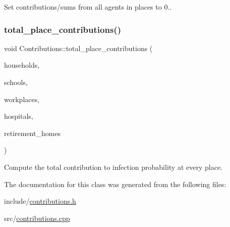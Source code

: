 Set contributions/sums from all agents in places to 0.. 

\mbox{\label{classContributions_a6312bd1753a80b88d91c6f94fb581eb2}} 
\subsubsection{\texorpdfstring{total\+\_\+place\+\_\+contributions()}{total\_place\_contributions()}}
{\footnotesize\ttfamily void Contributions\+::total\+\_\+place\+\_\+contributions (\begin{DoxyParamCaption}\item[{std\+::vector$<$ \hyperlink{classHousehold}{Household} $>$ \&}]{households,  }\item[{std\+::vector$<$ \hyperlink{classSchool}{School} $>$ \&}]{schools,  }\item[{std\+::vector$<$ \hyperlink{classWorkplace}{Workplace} $>$ \&}]{workplaces,  }\item[{std\+::vector$<$ \hyperlink{classHospital}{Hospital} $>$ \&}]{hospitals,  }\item[{std\+::vector$<$ \hyperlink{classRetirementHome}{Retirement\+Home} $>$ \&}]{retirement\+\_\+homes }\end{DoxyParamCaption})}



Compute the total contribution to infection probability at every place. 



The documentation for this class was generated from the following files\+:\begin{DoxyCompactItemize}
\item 
include/\hyperlink{contributions_8h}{contributions.\+h}\item 
src/\hyperlink{contributions_8cpp}{contributions.\+cpp}\end{DoxyCompactItemize}

